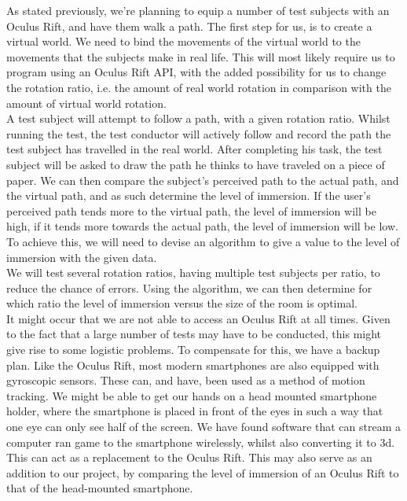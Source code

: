 As stated previously, we're planning to equip a number of test subjects with an Oculus Rift, and have them walk a path. The first step for us, is to create a virtual world. We need to bind the movements of the virtual world to the movements that the subjects make in real life. This will most likely require us to program using an Oculus Rift API, with the added possibility for us to change the rotation ratio, i.e. the amount of real world rotation in comparison with the amount of virtual world rotation. \\
A test subject will attempt to follow a path, with a given rotation ratio. Whilst running the test, the test conductor will actively follow and record the path the test subject has travelled in the real world. After completing his task, the test subject will be asked to draw the path he thinks to have traveled on a piece of paper. We can then compare the subject's perceived path to the actual path, and the virtual path, and as such determine the level of immersion. If the user's perceived path tends more to the virtual path, the level of immersion will be high, if it tends more towards the actual path, the level of immersion will be low. To achieve this, we will need to devise an algorithm to give a value to the level of immersion with the given data.\\
We will test several rotation ratios, having multiple test subjects per ratio, to reduce the chance of errors. Using the algorithm, we can then determine for which ratio the level of immersion versus the size of the room is optimal. \\
It might occur that we are not able to access an Oculus Rift at all times. Given to the fact that a large number of tests may have to be conducted, this might give rise to some logistic problems. To compensate for this, we have a backup plan. Like the Oculus Rift, most modern smartphones are also equipped with gyroscopic sensors. These can, and have, been used as a method of motion tracking. We might be able to get our hands on a head mounted smartphone holder, where the smartphone is placed in front of the eyes in such a way that one eye can only see half of the screen. We have found software that can stream a computer ran game to the smartphone wirelessly, whilst also converting it to 3d. This can act as a replacement to the Oculus Rift. This may also serve as an addition to our project, by comparing the level of immersion of an Oculus Rift to that of the head-mounted smartphone.  